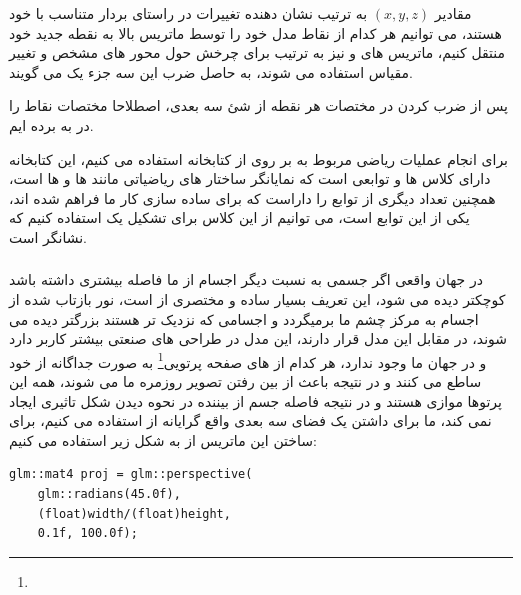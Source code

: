\documentclass[a4paper, 12pt]{report}
\newcommand{\lrbold}[1]{\lr{\textbf{#1}}}
\newcommand{\lrit}[1]{\lr{\textit{#1}}}
\begin{document}
    مقادیر $(x, y, z)$ به ترتیب نشان دهنده تغییرات در راستای بردار متناسب با خود هستند، می توانیم هر کدام از نقاط مدل خود را توسط ماتریس بالا به نقطه جدید خود منتقل کنیم، ماتریس های  و  نیز به ترتیب برای چرخش حول محور های مشخص و تغییر مقیاس استفاده می شوند، به حاصل ضرب این سه جزء یک  می گویند.\par
    پس از ضرب کردن  در مختصات هر نقطه از شئ سه بعدی، اصطلاحا مختصات نقاط را در  به  برده ایم.\par
    برای انجام عملیات ریاضی مربوط به  بر روی  از کتابخانه \lrbold{GLM} استفاده می کنیم، این کتابخانه دارای کلاس ها و توابعی است که نمایانگر ساختار های ریاضیاتی مانند  ها و  ها است، همچنین تعداد دیگری از توابع را داراست که برای ساده سازی کار ما فراهم شده اند، یکی از این توابع  است، می  توانیم از این کلاس برای تشکیل یک  استفاده کنیم که نشانگر \lrbold{Camera}  است.\par
    \vspace*{0.6cm}
    \subsubsection{}
    \vspace*{0.3cm}

    در جهان واقعی اگر جسمی به نسبت دیگر اجسام از ما فاصله بیشتری داشته باشد کوچکتر دیده می شود، این تعریف بسیار ساده و مختصری از  است، نور بازتاب شده از اجسام به مرکز چشم ما برمیگردد و اجسامی که نزدیک تر هستند بزرگتر دیده می شوند، در مقابل این مدل  قرار دارند، این مدل در طراحی های صنعتی بیشتر کاربر دارد و در جهان ما وجود ندارد، هر کدام از  های صفحه پرتویی\footnote{} به صورت جداگانه از خود ساطع می کنند و در نتیجه باعث از بین رفتن تصویر روزمره ما می شوند، همه این پرتوها موازی هستند و در نتیجه فاصله جسم از بیننده در نحوه دیدن شکل تاثیری ایجاد نمی کند، ما برای داشتن یک فضای سه بعدی واقع گرایانه از  استفاده می کنیم، برای ساختن این ماتریس از  به شکل زیر استفاده می کنیم:

    \begin{LTR}
    \small
        \begin{lstlisting}[style=C++Style,caption=\lrit{fragment shader to use texture}]
glm::mat4 proj = glm::perspective(
    glm::radians(45.0f),
    (float)width/(float)height,
    0.1f, 100.0f);
        \end{lstlisting}
    \end{LTR}
    \normalsize
    \vspace*{0.3cm}
\end{document}
